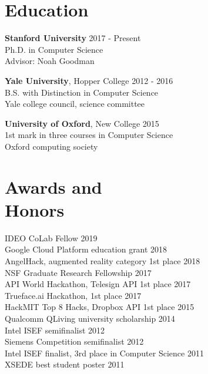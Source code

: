\documentclass[margin, 10pt]{res} %
\begin{document}
\begin{resume}


\section{Education}

\textbf{Stanford University} \hfill 2017 - Present \\
Ph.D. in Computer Science \\
Advisor: Noah Goodman

\textbf{Yale University}, Hopper College \hfill 2012 - 2016 \\
B.S. with Distinction in Computer Science \\
Yale college council, science committee

\textbf{University of Oxford}, New College \hfill 2015 \\
1st mark in three courses in Computer Science\\
Oxford computing society


\section{Awards and \\ Honors}

IDEO CoLab Fellow \hfill 2019 \\
Google Cloud Platform education grant \hfill 2018 \\
AngelHack, augmented reality category 1st place \hfill 2018 \\
NSF Graduate Research Fellowship \hfill 2017 \\
API World Hackathon, Telesign API 1st place \hfill 2017 \\
Trueface.ai Hackathon, 1st place \hfill 2017 \\
HackMIT Top 8 Hacks, Dropbox API 1st place \hfill 2015 \\
Qualcomm QLiving university scholarship \hfill 2014 \\
Intel ISEF semifinalist \hfill 2012 \\
Siemens Competition semifinalist \hfill 2012 \\
Intel ISEF finalist, 3rd place in Computer Science \hfill 2011 \\
XSEDE best student poster \hfill 2011 \\


\end{resume}
\end{document}
